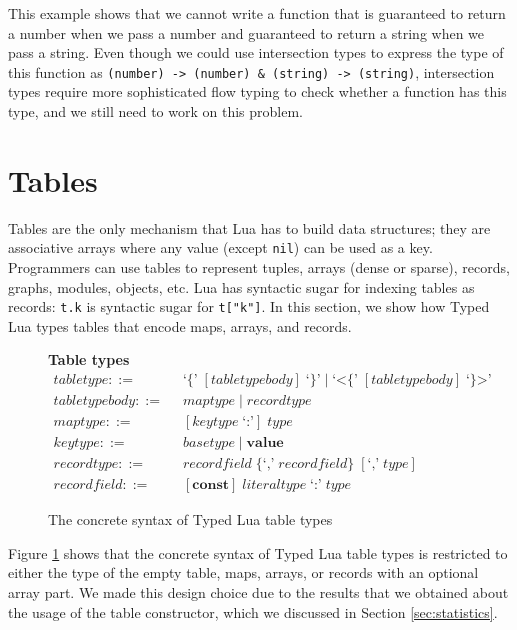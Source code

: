 This example shows that we cannot write a function that is
guaranteed to return a number when we pass a number and
guaranteed to return a string when we pass a string.
Even though we could use intersection types to express the type
of this function as
\texttt{(number) -> (number) \string& (string) -> (string)},
intersection types require more sophisticated flow typing to
check whether a function has this type,
and we still need to work on this problem.

\section{Tables}
\label{sec:tables}

Tables are the only mechanism that Lua has to build data structures;
they are associative arrays where any value (except \texttt{nil})
can be used as a key.
Programmers can use tables to represent tuples, arrays (dense or sparse),
records, graphs, modules, objects, etc.
Lua has syntactic sugar for indexing tables as records:
\texttt{t.k} is syntactic sugar for \texttt{t["k"]}.
In this section, we show how Typed Lua types tables that encode maps,
arrays, and records.

\begin{figure}[!ht]
\textbf{Table types}\\
\dstart
\begin{align*}
\textit{tabletype} ::= & \;\; \texttt{`\{'} \; [\textit{tabletypebody}] \; \texttt{`\}'} \; | \;
  \texttt{`<\{'} \; [\textit{tabletypebody}] \; \texttt{`\}>'}\\
\textit{tabletypebody} ::= & \;\; \textit{maptype} \; | \;
  \textit{recordtype}\\
\textit{maptype} ::= & \;\; [\textit{keytype} \; \texttt{`:'}] \; \textit{type}\\
\textit{keytype} ::= & \;\; \textit{basetype} \; | \;
  \textbf{value}\\
\textit{recordtype} ::= & \;\; \textit{recordfield} \; \{\texttt{`,'} \; \textit{recordfield}\} \; [\texttt{`,'} \; \textit{type}]\\
\textit{recordfield} ::= & \;\; [\textbf{const}] \; \textit{literaltype} \; \texttt{`:'} \; \textit{type}
\end{align*}
\dend
\caption{The concrete syntax of Typed Lua table types}
\label{fig:tables}
\end{figure}

Figure \ref{fig:tables} shows that the concrete syntax of Typed Lua
table types is restricted to either the type of the empty table,
maps, arrays, or records with an optional array part.
We made this design choice due to the results that we obtained
about the usage of the table constructor, which we discussed
in Section \ref{sec:statistics}.

